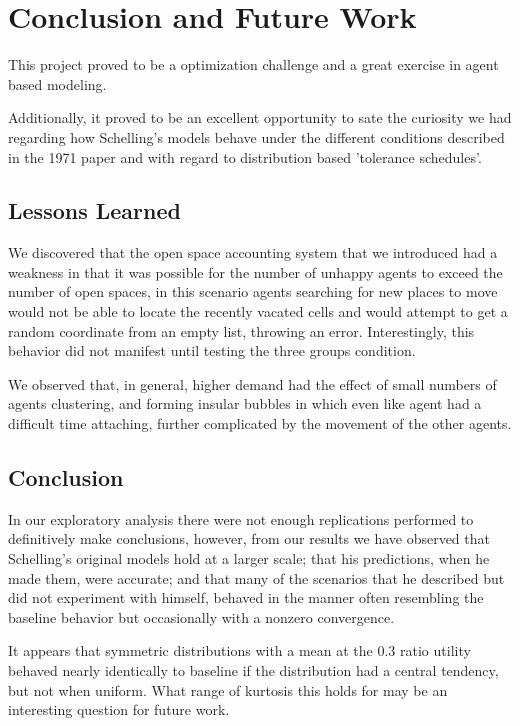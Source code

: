 \documentclass[sigplan,nonacm]{acmart}
\begin{document}
\section{Conclusion and Future Work}

This project proved to be a optimization challenge and a great exercise in agent based modeling.

Additionally, it proved to be an excellent opportunity to sate the curiosity we had regarding how Schelling's models behave
under the different conditions described in the 1971 paper and with regard to distribution based 'tolerance schedules'.

\subsection{Lessons Learned}

We discovered that the open space accounting system that we introduced had a weakness in that it was possible 
for the number of unhappy agents to exceed the number of open spaces,
in this scenario agents searching for new places to move would not be able to locate the recently vacated cells and would
attempt to get a random coordinate from an empty list, throwing an error. Interestingly, this behavior did not manifest until testing the three groups condition.

We observed that, in general, higher demand had the effect of small numbers of agents clustering, 
and forming insular bubbles in which even like agent had a difficult time attaching, further complicated by the movement of the other agents.

\subsection{Conclusion}

In our exploratory analysis there were not enough replications performed to definitively make conclusions, however, from our results
we have observed that Schelling's original models hold at a larger scale; that his predictions, when he made them, were accurate;
and that many of the scenarios that he described but did not experiment with himself, behaved in the manner often resembling
the baseline behavior but occasionally with a nonzero convergence.

It appears that symmetric distributions with a mean at the 0.3 ratio utility behaved nearly identically to baseline if
the distribution had a central tendency, but not when uniform. 
What range of kurtosis this holds for may be an interesting question for future work.
\end{document}
